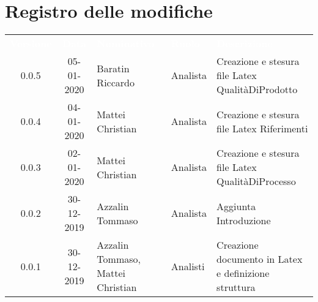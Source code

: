 \section*{Registro delle modifiche}
{
\renewcommand{\arraystretch}{1.5}
\centering
\begin{longtable}{ c c  C{4cm}  C{3cm} C{4cm}}
\textcolor{white}{\textbf{Versione}} & \textcolor{white}{\textbf{Data}} & \textcolor{white}{\textbf{Nominativo}} & \textcolor{white}{\textbf{Ruolo}} & \textcolor{white}{\textbf{Descrizione}}\\	
0.0.5 & 05-01-2020 & Baratin Riccardo & Analista & Creazione e stesura file Latex QualitàDiProdotto \\
0.0.4 & 04-01-2020 & Mattei Christian & Analista & Creazione e stesura file Latex Riferimenti \\
0.0.3 & 02-01-2020 & Mattei Christian & Analista & Creazione e stesura file Latex QualitàDiProcesso \\
0.0.2 & 30-12-2019 & Azzalin Tommaso & Analista & Aggiunta Introduzione \\
0.0.1 & 30-12-2019 & Azzalin Tommaso, Mattei Christian & Analisti & Creazione documento in Latex e definizione struttura \\	
		
\end{longtable}
}

